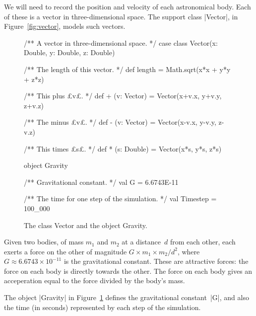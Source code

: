 We will need to record the position and velocity of each astronomical body.
Each of these is a vector in three-dimensional space.  The support class
|Vector|, in Figure~\ref{fig:vector}, models such vectors.


\begin{figure}
\begin{scala}
/** A vector in three-dimensional space. */
case class Vector(x: Double, y: Double, z: Double){
  /** The length of this vector. */
  def length = Math.sqrt(x*x + y*y + z*z)

  /** This plus £v£. */
  def + (v: Vector) = Vector(x+v.x, y+v.y, z+v.z)

  /** The minus £v£. */
  def - (v: Vector) = Vector(x-v.x, y-v.y, z-v.z)

  /** This times £s£. */
  def * (s: Double) = Vector(x*s, y*s, z*s)
}

object Gravity{
  /** Gravitational constant. */
  val G = 6.6743E-11

  /** The time for one step of the simulation. */
  val Timestep = 100_000
}
\end{scala}
\caption{The class {\scalashape Vector} and the object {\scalashape Gravity}.}
\label{fig:vector}\label{fig:Gravity}
\end{figure}


Given two bodies, of mass $m_1$ and $m_2$ at a distance~$d$ from each other,
each exerts a force on the other of magnitude $G \times m_1 \times m_2 / d^2$,
where $G \approx 6.6743 \times 10^{-11}$ is the gravitational constant.  These
are attractive forces: the force on each body is directly towards the other.
The force on each body gives an acceperation equal to the force divided by the
body's mass.

The object |Gravity| in Figure~\ref{fig:Gravity} defines the
gravitational constant~|G|, and also the time (in seconds) represented by each
step of the simulation. 


